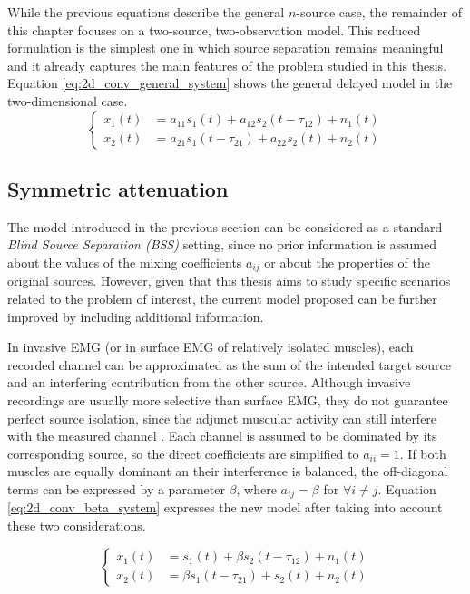 While the previous equations describe the general $n$-source case, the remainder of this chapter focuses on a two-source, two-observation model. This reduced formulation is the simplest one in which source separation remains meaningful and it already captures the main features of the problem studied in this thesis. Equation \ref{eq:2d_conv_general_system} shows the general delayed model in the two-dimensional case.
\begin{equation}
\left\{
\begin{aligned}
x_1(t) &= a_{11}s_1(t) + a_{12}s_2(t-\tau_{12}) + n_1(t) \\
x_2(t) &= a_{21}s_1(t-\tau_{21}) + a_{22}s_2(t) + n_2(t) 
\end{aligned}
\right.
\label{eq:2d_conv_general_system}
\end{equation}

\subsection{Symmetric attenuation}
\label{sec:symmetric_attenuation}

The model introduced in the previous section can be considered as a standard \textit{Blind Source Separation (BSS)} setting, since no prior information is assumed about the values of the mixing coefficients $a_{ij}$ or about the properties of the original sources. However, given that this thesis aims to study specific scenarios related to the problem of interest, the current model proposed can be further improved by including additional information. 

In invasive EMG (or in surface EMG of relatively isolated muscles), each recorded channel can be approximated as the sum of the intended target source and an interfering contribution from the other source. Although invasive recordings are usually more selective than surface EMG, they do not guarantee perfect source isolation, since the adjunct muscular activity can still interfere with the measured channel 
\cite{m_consensus_nodate,l_analysis_2020}. Each channel is assumed to be dominated by its corresponding source, so the direct coefficients are simplified to $a_{ii}=1$. If both muscles are equally dominant an their interference is balanced, the off-diagonal terms can be expressed by a parameter $\beta$, where $a_{ij}=\beta$ for $\forall i\neq j$. Equation \ref{eq:2d_conv_beta_system} expresses the new model after taking into account these two considerations.

\begin{equation}
\left\{
\begin{aligned}
x_1(t) &= s_1(t) + \beta s_2(t-\tau_{12}) + n_1(t) \\
x_2(t) &= \beta s_1(t-\tau_{21}) + s_2(t) + n_2(t) 
\end{aligned}
\right.
\label{eq:2d_conv_beta_system}
\end{equation}

